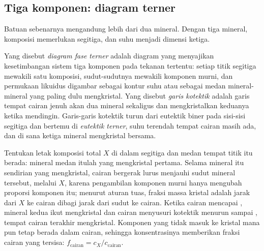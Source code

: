 \subsection*{Tiga komponen: diagram terner}

Batuan sebenarnya mengandung lebih dari dua mineral. Dengan tiga mineral, komposisi memerlukan
segitiga, dan suhu menjadi dimensi ketiga.

\begin{definition}\label{def:b2:mantle-melting:ternary}
Yang disebut \emph{diagram fase terner} adalah diagram yang menyajikan
kesetimbangan sistem tiga komponen pada tekanan tertentu: setiap titik
segitiga mewakili satu komposisi, sudut-sudutnya mewakili komponen murni, dan
permukaan likuidus digambar sebagai kontur suhu atau sebagai medan
mineral-mineral yang paling dulu mengkristal. Yang disebut \emph{garis kotektik} adalah
garis tempat cairan jenuh akan dua mineral sekaligus dan
mengkristalkan keduanya ketika mendingin. Garis-garis kotektik turun dari eutektik
biner pada sisi-sisi segitiga dan bertemu di \emph{eutektik
terner}, suhu terendah tempat cairan masih ada,
dan di sana ketiga mineral mengkristal bersama.
\end{definition}

\begin{method}\label{met:b2:mantle-melting:ternary}
Tentukan letak komposisi total $X$ di dalam segitiga dan medan tempat titik itu berada:
mineral medan itulah yang mengkristal pertama. Selama mineral itu sendirian yang mengkristal,
cairan bergerak lurus menjauhi sudut mineral tersebut,
melalui $X$, karena pengambilan komponen murni hanya mengubah proporsi komponen itu; menurut
aturan tuas, fraksi massa kristal adalah jarak dari $X$ ke cairan
dibagi jarak dari sudut ke cairan. Ketika cairan mencapai , mineral kedua ikut mengkristal dan cairan menyusuri kotektik
menurun sampai , tempat cairan terakhir mengkristal. Komponen
yang tidak masuk ke kristal mana pun tetap berada dalam cairan, sehingga konsentrasinya memberikan
fraksi cairan yang tersisa: $f_{\text{cairan}} = c_X/c_{\text{cairan}}$.
\end{method}

